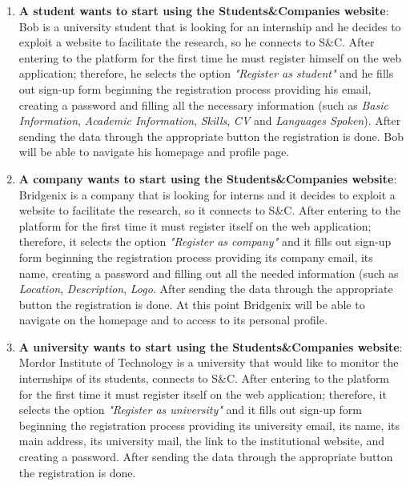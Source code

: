         \begin{enumerate}
            
            \item \textbf{A student wants to start using the Students\&Companies website}:
            \\Bob is a university student that is looking for an internship and he decides to exploit a website to facilitate the research, so he connects to S\&C. After entering to the platform for the first time he must register himself on the web application; therefore, he selects the option \textit{"Register as student"} and he fills out sign-up form beginning the registration process providing his email, creating a password and filling all the necessary information (such as \textit{Basic Information}, \textit{Academic Information}, \textit{Skills}, \textit{CV} and \textit{Languages Spoken}). After sending the data through the appropriate button the registration is done. Bob will be able to navigate his homepage and profile page.

            \item \textbf{A company wants to start using the Students\&Companies website}:
            \\Bridgenix is a company that is looking for interns and it decides to exploit a website to facilitate the research, so it connects to S\&C. After entering to the platform for the first time it must register itself on the web application; therefore, it selects the option \textit{"Register as company"} and it fills out sign-up form beginning the registration process providing its company email, its name, creating a password and filling out all the needed information (such as \textit{Location}, \textit{Description}, \textit{Logo}. After sending the data through the appropriate button the registration is done. At this point Bridgenix will be able to navigate on the homepage and to access to its personal profile.

            \item \textbf{A university wants to start using the Students\&Companies website}:
            Mordor Institute of Technology is a university that would like to monitor the internships of its students, connects to S\&C. After entering to the platform for the first time it must register itself on the web application; therefore, it selects the option \textit{"Register as university"} and it fills out sign-up form beginning the registration process providing its university email, its name, its main address, its university mail, the link to the institutional website, and creating a password. After sending the data through the appropriate button the registration is done.
         

\end{enumerate}
